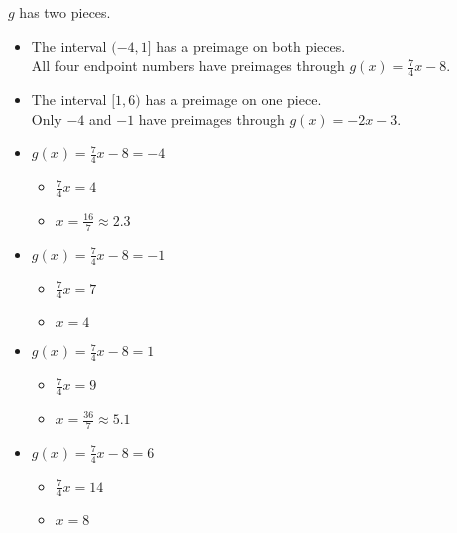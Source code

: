 \documentclass{ximera}
\begin{document}
$g$ has two pieces. 

\begin{itemize}
\item The interval $(-4, 1]$ has a preimage on both pieces. \\
All four endpoint numbers have preimages through $g(x) = \frac{7}{4}x-8$. 
\item The interval $[1, 6)$ has a preimage on one piece. \\
Only $-4$ and $-1$ have preimages through $g(x) = -2x-3$.
\end{itemize}







\begin{itemize}
\item $g(x) = \frac{7}{4}x -8 = -4$
\begin{itemize}
\item $\frac{7}{4}x = 4$
\item $x = \frac{16}{7} \approx 2.3$
\end{itemize}
\end{itemize}




\begin{itemize}
\item $g(x) = \frac{7}{4}x -8 = -1$
\begin{itemize}
\item $\frac{7}{4}x = 7$
\item $x = 4$
\end{itemize}
\end{itemize}

\begin{itemize}
\item $g(x) = \frac{7}{4}x -8 = 1$
\begin{itemize}
\item $\frac{7}{4}x = 9$
\item $x = \frac{36}{7} \approx 5.1$
\end{itemize}
\end{itemize}

\begin{itemize}
\item $g(x) = \frac{7}{4}x -8 = 6$
\begin{itemize}
\item $\frac{7}{4}x = 14$
\item $x = 8$
\end{itemize}
\end{itemize}
\end{document}
